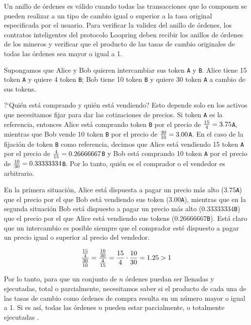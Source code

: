\documentclass[UTF8,nofonts]{article}
\begin{document}
\begin{multicols}{2}
Un anillo de \'ordenes es v\'alido cuando todas las transacciones que lo componen se pueden realizar a un tipo de cambio igual o superior a la tasa original especificada por el usuario. Para verificar la validez del anillo de \'ordenes, los contratos inteligentes del protocolo Loopring deben recibir los anillos de \'ordenes de los mineros y verificar que el producto de las tasas de cambio originales de todas las \'ordenes sea mayor o igual a 1.

Supongamos que Alice y Bob quieren intercambiar sus token \verb|A| y \verb|B|. Alice tiene 15 token \verb|A| y quiere 4 token \verb|B|; Bob tiene 10 token \verb|B| y quiere 30 token \verb|A| a cambio de sus tokens.


?`Qui\'en est\'a comprando y qui\'en est\'a vendiendo? Esto depende solo en los activos que necesitamos fijar para dar las cotizaciones de precios. Si token \verb|A| es la referencia, entonces Alice est\'a comprando token \verb|B| por el precio de ${15 \over 4} = 3.75$\verb|A|, mientras que Bob vende 10 token \verb|B| por el precio de ${30 \over 10} = 3.00$\verb|A|. En el caso de la fijaci\'on de token \verb|B| como referencia, decimos que Alice est\'a vendiendo 15 token \verb|A| por el precio de ${4 \over 15} = 0.26666667$\verb|B| y Bob est\'a comprando 10 token \verb|A| por el precio de ${10 \over 30} = 0.33333334 $\verb|B|. Por lo tanto, qui\'en es el comprador o el vendedor es arbitrario.

En la primera situaci\'on, Alice est\'a dispuesta a pagar un precio m\'as alto ($3.75$\verb|A|) que el precio por el que Bob est\'a vendiendo sus token ($3.00$\verb|A|), mientras que en la segunda situaci\'on Bob est\'a dispuesto a pagar un precio m\'as alto ($ 0.33333334 $\verb|B|) que el precio por el que Alice est\'a vendiendo sus tokens ($ 0.26666667 $\verb|B|). Est\'a claro que un intercambio es posible siempre que el comprador est\'e dispuesto a pagar un precio igual o superior al precio del vendedor.

\begin{equation}
{{15\over 4} \over {30\over 10}} = {{10\over 30} \over {4\over 15}}={15 \over 4} \cdot {10 \over 30} = 1.25 > 1
\end{equation}

Por lo tanto, para que un conjunto de $n$ \'ordenes puedan ser llenadas y ejecutadas, total o parcialmente, necesitamos saber si el producto de cada una de las tasas de cambio como \'ordenes de compra resulta en un n\'umero mayor o igual a 1. Si es as\'i, todas las \'ordenes $n$ pueden estar parcialmente, o totalmente ejecutadas \cite {supersymmetry}.


\end{multicols}
\end{document}
